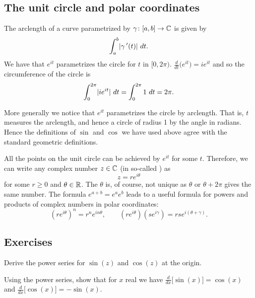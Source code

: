 \subsection{The unit circle and polar coordinates}

The arclength of a curve parametrized by $\gamma \colon [a,b] \to {\mathbb{C}}$ is given
by
\begin{equation*}
\int_a^b \lvert {\gamma^{\:\prime}(t)} \rvert ~ dt .
\end{equation*}
We have that $e^{it}$ parametrizes the circle for $t$ in $[0,2\pi)$.
$\frac{d}{dt} \bigl( e^{it} \bigr) = ie^{it}$ and so the circumference of the
circle is
\begin{equation*}
\int_0^{2\pi} \lvert {i e^{it}} \rvert  ~  dt
=
\int_0^{2\pi} 1  ~  dt  = 2\pi .
\end{equation*}

More generally we notice that $e^{it}$ parametrizes the circle by arclength.
That is, $t$ measures the arclength, and hence a circle of radius 1 by
the angle in radians.  Hence the definitions of $\sin$ and $\cos$ we have
used above agree with the standard geometric definitions.

All the points on the unit circle can be achieved by
$e^{it}$ for some $t$.
Therefore,
we can write
any complex number $z \in {\mathbb{C}}$
(in so-called \emph{}) as
\begin{equation*}
z = r e^{i\theta}
\end{equation*}
for some $r \geq 0$ and $\theta \in {\mathbb{R}}$.  The $\theta$ is, of course,
not unique as $\theta$ or $\theta+2\pi$ gives the same number.
The formula $e^{a+b} = e^a e^b$ leads to a useful formula for powers
and products of complex numbers in polar coordinates:
\begin{equation*}
{(r e^{i\theta})}^n
= r^n e^{i n \theta} ,
\qquad
(r e^{i\theta})
(s e^{i\gamma})
=
rs e^{i(\theta+\gamma)} .
\end{equation*}

\subsection{Exercises}

\begin{exercise}
Derive the power series for $\sin(z)$ and $\cos(z)$ at the origin.
\end{exercise}

\begin{exercise}
Using the power series, show that for $x$ real we have
$\frac{d}{dx} \bigl[ \sin(x)\bigr] = \cos(x)$ and
$\frac{d}{dx} \bigl[ \cos(x)\bigr] = -\sin(x)$.
\end{exercise}


